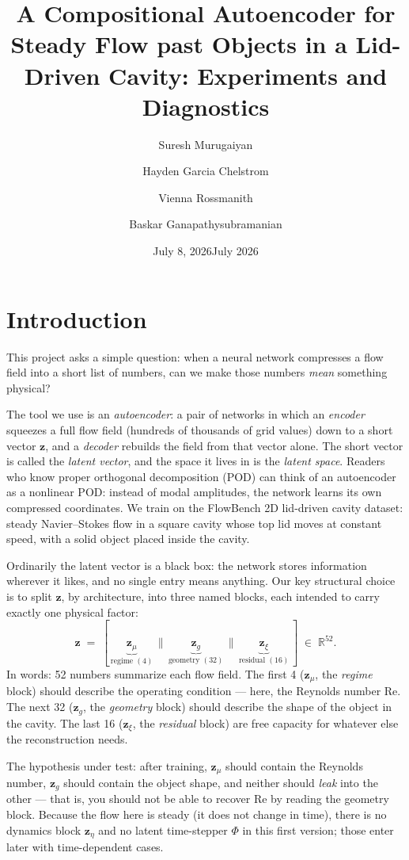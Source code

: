 \documentclass[11pt]{article}
\title{\large \textbf{A Compositional Autoencoder for Steady Flow past Objects
in a Lid-Driven Cavity: Experiments and Diagnostics}}
\author[]{Suresh Murugaiyan}
\affil[]{Translational AI Center, Iowa State University, Ames, IA}
\author[]{Hayden Garcia Chelstrom}
\affil[]{Translational AI Center, Iowa State University, Ames, IA}
\author[]{Vienna Rossmanith}
\affil[]{Translational AI Center, Iowa State University, Ames, IA}
\author[]{Baskar Ganapathysubramanian}
\affil[]{Translational AI Center, Iowa State University, Ames, IA}
\date{July 8, 2026}
\date{July 2026}
\begin{document}
\maketitle

\section{Introduction}

This project asks a simple question: when a neural network compresses a
flow field into a short list of numbers, can we make those numbers
\emph{mean} something physical?

The tool we use is an \emph{autoencoder}: a pair of networks in which an
\emph{encoder} squeezes a full flow field (hundreds of thousands of grid
values) down to a short vector $\boldsymbol{z}$, and a \emph{decoder}
rebuilds the field from that vector alone. The short vector is called the
\emph{latent vector}, and the space it lives in is the \emph{latent
space}. Readers who know proper orthogonal decomposition (POD) can think
of an autoencoder as a nonlinear POD: instead of modal amplitudes, the
network learns its own compressed coordinates. We train on the FlowBench
2D lid-driven cavity dataset: steady Navier--Stokes flow in a square
cavity whose top lid moves at constant speed, with a solid object placed
inside the cavity.

Ordinarily the latent vector is a black box: the network stores
information wherever it likes, and no single entry means anything. Our
key structural choice is to split $\boldsymbol{z}$, by architecture, into
three named blocks, each intended to carry exactly one physical factor:
%
\begin{equation}
  \boldsymbol{z} \;=\;
  [\, \underbrace{\boldsymbol{z}_{\mu}}_{\text{regime }(4)}
  \,\|\,
  \underbrace{\boldsymbol{z}_{g}}_{\text{geometry }(32)}
  \,\|\,
  \underbrace{\boldsymbol{z}_{\xi}}_{\text{residual }(16)} \,]
  \;\in\; \mathbb{R}^{52}.
\end{equation}
%
In words: 52 numbers summarize each flow field. The first 4
($\boldsymbol{z}_{\mu}$, the \emph{regime} block) should describe the
operating condition --- here, the Reynolds number Re. The next 32
($\boldsymbol{z}_{g}$, the \emph{geometry} block) should describe the
shape of the object in the cavity. The last 16 ($\boldsymbol{z}_{\xi}$,
the \emph{residual} block) are free capacity for whatever else the
reconstruction needs.

The hypothesis under test: after training, $\boldsymbol{z}_{\mu}$ should
contain the Reynolds number, $\boldsymbol{z}_{g}$ should contain the
object shape, and neither should \emph{leak} into the other --- that is,
you should not be able to recover Re by reading the geometry block.
Because the flow here is steady (it does not change in time), there is no
dynamics block $\boldsymbol{z}_{\eta}$ and no latent time-stepper $\Phi$
in this first version; those enter later with time-dependent cases.
\end{document}
